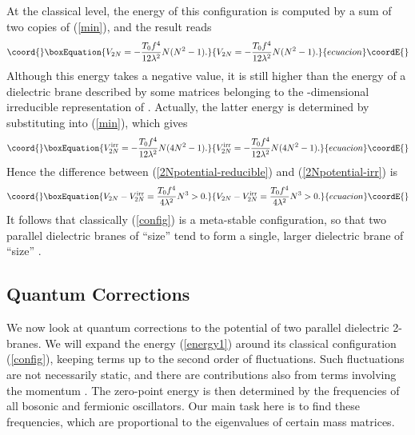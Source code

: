 \documentclass[a4paper,12pt]{article}
\begin{document}
At the classical level, the energy of this configuration is computed by a sum 
of two copies of (\ref{min}), and the result reads
\begin{equation}\coord{}\boxEquation{
V_{2N}=-\frac{T_{0}f^{4}}{12\lambda^{2}}N(N^{2}-1).
\label{2Npotential-reducible}
}{
V_{2N}=-\frac{T_{0}f^{4}}{12\lambda^{2}}N(N^{2}-1).
}{ecuacion}\coordE{}\end{equation}
Although this energy takes a negative value, it is still higher than the 
energy of a dielectric brane described by some matrices \coordHE{} belonging to 
the \coordHE{}-dimensional irreducible representation of 
\coordHE{} \cite{Myers}. Actually, the latter energy is determined by 
substituting \coordHE{} into (\ref{min}), which gives
\begin{equation}\coord{}\boxEquation{
V_{2N}^{\rm irr}=-\frac{T_{0}f^{4}}{12\lambda^{2}}N(4N^{2}-1).
\label{2Npotential-irr}
}{
V_{2N}^{\rm irr}=-\frac{T_{0}f^{4}}{12\lambda^{2}}N(4N^{2}-1).
}{ecuacion}\coordE{}\end{equation}
Hence the difference between (\ref{2Npotential-reducible}) 
and (\ref{2Npotential-irr}) is
\begin{equation}\coord{}\boxEquation{
V_{2N}-V_{2N}^{\rm irr}=\frac{T_{0}f^{4}}{4\lambda^{2}}N^{3} > 0.
}{
V_{2N}-V_{2N}^{\rm irr}=\frac{T_{0}f^{4}}{4\lambda^{2}}N^{3} > 0.
}{ecuacion}\coordE{}\end{equation}
It follows that classically (\ref{config}) is a meta-stable configuration, so that two parallel dielectric branes of ``size'' \coordHE{} tend to form a single, 
larger dielectric brane of ``size'' \coordHE{}.
\subsection{Quantum Corrections}
We now look at quantum corrections to the potential of two parallel dielectric 2-branes. We will expand the energy (\ref{energy1}) around its classical configuration (\ref{config}), keeping terms up to the second order of fluctuations. Such fluctuations are not necessarily static, and there are  contributions also from terms involving the momentum \coordHE{}. The zero-point energy is then determined by the frequencies of all bosonic and fermionic oscillators. Our main task here is to find these frequencies, which are proportional to the eigenvalues of certain mass matrices.
\end{document}

